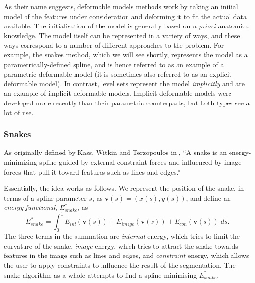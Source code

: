 
As their name suggests, deformable models methods work by taking an initial model of the features under consideration and deforming it to fit the actual data available. The initialisation of the model is generally based on \emph{a priori} anatomical knowledge. The model itself can be represented in a variety of ways, and these ways correspond to a number of different approaches to the problem. For example, the snakes method, which we will see shortly, represents the model as a parametrically-defined spline, and is hence referred to as an example of a parametric deformable model (it is sometimes also referred to as an explicit deformable model). In contrast, level sets represent the model \emph{implicitly} and are an example of implicit deformable models. Implicit deformable models were developed more recently than their parametric counterparts, but both types see a lot of use.

\subsubsection{Snakes}


As originally defined by Kass, Witkin and Terzopoulos in \cite{kass88}, ``A snake is an energy-minimizing spline guided by external constraint forces and influenced by image forces that pull it toward features such as lines and edges.''

Essentially, the idea works as follows. We represent the position of the snake, in terms of a spline parameter $s$, as $\mathbf{v}(s) = (x(s),y(s))$, and define an \emph{energy functional}, $E_{snake}^*$, as
%
\[
E_{snake}^* = \int_0^1 E_{int}(\mathbf{v}(s)) + E_{image}(\mathbf{v}(s)) + E_{con}(\mathbf{v}(s)) \; ds.
\]
%
The three terms in the summation are \emph{internal} energy, which tries to limit the curvature of the snake, \emph{image} energy, which tries to attract the snake towards features in the image such as lines and edges, and \emph{constraint} energy, which allows the user to apply constraints to influence the result of the segmentation. The snake algorithm as a whole attempts to find a spline minimising $E_{snake}^*$.

